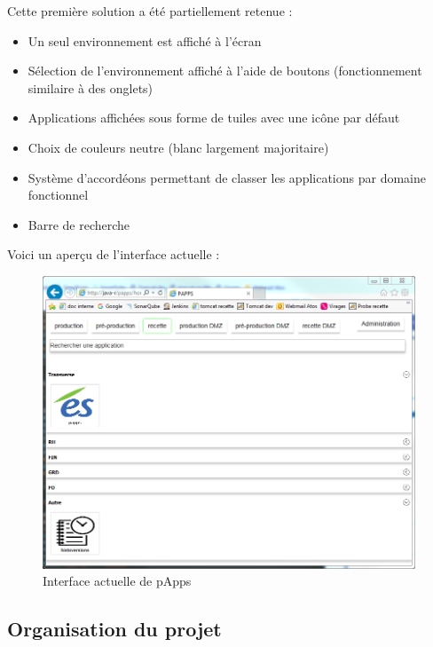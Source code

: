 \documentclass[12pt]{report}
\begin{document}
    \newpage
    
    Cette première solution a été partiellement retenue :
    \begin{itemize}[itemsep=1pt]
        \item Un seul environnement est affiché à l'écran
        \item Sélection de l'environnement affiché à l'aide de boutons (fonctionnement similaire à des onglets)
        \item Applications affichées sous forme de tuiles avec une icône par défaut
        \item Choix de couleurs neutre (blanc largement majoritaire)
        \item Système d'accordéons permettant de classer les applications par domaine fonctionnel
        \item Barre de recherche
    \end{itemize}
    
    Voici un aperçu de l'interface actuelle :
    
    \begin{figure}[ht]
        \centering
        \includegraphics[width=0.99\textwidth]{img/interface_actuelle_papps.png}
        \caption{Interface actuelle de pApps}
        \label{fig:papps_interface_actuelle}
    \end{figure}
    
    \subsection{Organisation du projet}
    
\end{document}
